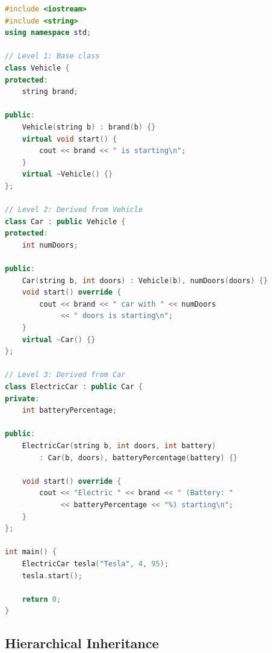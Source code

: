 \begin{lstlisting}[language={C++}]
#include <iostream>
#include <string>
using namespace std;

// Level 1: Base class
class Vehicle {
protected:
    string brand;
    
public:
    Vehicle(string b) : brand(b) {}
    virtual void start() {
        cout << brand << " is starting\n";
    }
    virtual ~Vehicle() {}
};

// Level 2: Derived from Vehicle
class Car : public Vehicle {
protected:
    int numDoors;
    
public:
    Car(string b, int doors) : Vehicle(b), numDoors(doors) {}
    void start() override {
        cout << brand << " car with " << numDoors 
             << " doors is starting\n";
    }
    virtual ~Car() {}
};

// Level 3: Derived from Car
class ElectricCar : public Car {
private:
    int batteryPercentage;
    
public:
    ElectricCar(string b, int doors, int battery)
        : Car(b, doors), batteryPercentage(battery) {}
    
    void start() override {
        cout << "Electric " << brand << " (Battery: " 
             << batteryPercentage << "%) starting\n";
    }
};

int main() {
    ElectricCar tesla("Tesla", 4, 95);
    tesla.start();
    
    return 0;
}
\end{lstlisting}

\hypertarget{hierarchical-inheritance}{%
\subsection{Hierarchical Inheritance}\label{hierarchical-inheritance}}

